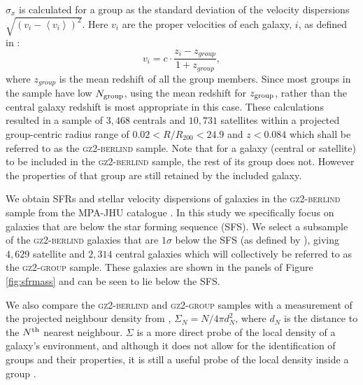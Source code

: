 \documentclass[useAMS,usenatbib]{mn2e}
\begin{document}
$\sigma_x$ is calculated for a group as the standard deviation of the velocity dispersions $\sqrt{(v_i - \left< v_i\right>)^2}$. Here $v_i$ are the proper velocities of each galaxy, $i$, as defined in \cite{danese80}:
\begin{equation}\label{eq:propervel}
v_i = c \cdot \frac{z_i - z_{group}}{1 + z_{group}},
\end{equation}
where $z_{group}$ is the mean redshift of all the group members. Since most groups in the sample have low $N_{\rm{group}}$, using the mean redshift for $z_{\rm{group}}$, rather than the central galaxy redshift is most appropriate in this case. These calculations resulted in a sample of $3,468$ centrals and $10,731$ satellites within a projected group-centric radius range of $0.02 < R/R_{200} < 24.9$ and $z < 0.084$ which shall be referred to as the \textsc{gz2-berlind} sample. Note that for a galaxy (central or satellite) to be included in the \textsc{gz2-berlind} sample, the rest of its group does not. However the properties of that group are still retained by the included galaxy. 

We obtain SFRs and stellar velocity dispersions of galaxies in the \textsc{gz2-berlind} sample from the MPA-JHU catalogue \citep{kauffmann03, brinchmann04}. In this study we specifically focus on galaxies that are below the star forming sequence (SFS). We select a subsample of the \textsc{gz2-berlind} galaxies that are $1\sigma$ below the SFS (as defined by \cite{peng10}), giving $4,629$ satellite and $2,314$ central galaxies which will collectively be referred to as the \textsc{gz2-group} sample. These galaxies are shown in the panels of Figure \ref{fig:sfrmass} and can be seen to lie below the SFS.



We also compare the \textsc{gz2-berlind} and \textsc{gz2-group} samples with a measurement of the projected neighbour density from \cite{Baldry06}, $\Sigma_N = N/4\pi d_N^2$, where $d_N$ is the distance to the $N^{\rm{th}}$ nearest neighbour. $\Sigma$ is a more direct probe of the local density of a galaxy's environment, and although it does not allow for the identification of groups and their properties, it is still a useful probe of the local density inside a group  \cite[see][for a comparison of various environment parametrisations]{muldrew12}.
\end{document}
